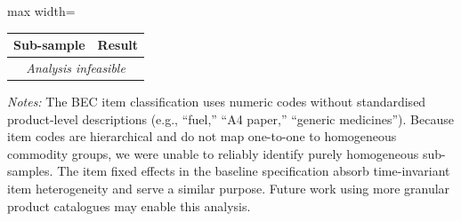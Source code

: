\caption{Homogeneous Sub-Sample Analysis}
\label{tab:homogeneous_subsample}
\begin{adjustbox}{max width=\textwidth}
\begin{threeparttable}
\small
\begin{tabular}{lc}
\toprule
Sub-sample & Result \\
\midrule
\multicolumn{2}{c}{\textit{Analysis infeasible}} \\
\bottomrule
\end{tabular}
\begin{tablenotes}
\small
\item \textit{Notes:} The BEC item classification uses numeric codes without
standardised product-level descriptions (e.g., ``fuel,'' ``A4 paper,''
``generic medicines''). Because item codes are hierarchical and do not map
one-to-one to homogeneous commodity groups, we were unable to reliably identify
purely homogeneous sub-samples. The item fixed effects in the baseline
specification absorb time-invariant item heterogeneity and serve a similar
purpose. Future work using more granular product catalogues may enable this
analysis.
\end{tablenotes}
\end{threeparttable}
\end{adjustbox}
